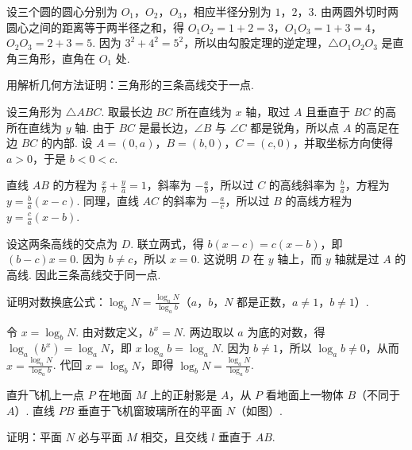 \documentclass[UTF8,a4paper,oneside,11pt]{ctexbook}
\begin{document}
\begin{solution}
设三个圆的圆心分别为 \(O_1\)，\(O_2\)，\(O_3\)，相应半径分别为 \(1\)，\(2\)，\(3\). 由两圆外切时两圆心之间的距离等于两半径之和，得 \(O_1O_2=1+2=3\)，\(O_1O_3=1+3=4\)，\(O_2O_3=2+3=5\). 因为 \(3^{2}+4^{2}=5^{2}\)，所以由勾股定理的逆定理，\(\triangle O_1O_2O_3\) 是直角三角形，直角在 \(O_1\) 处.
\end{solution}

\begin{problem}
用解析几何方法证明：三角形的三条高线交于一点.
\end{problem}

\begin{solution}
设三角形为 \(\triangle ABC\). 取最长边 \(BC\) 所在直线为 \(x\) 轴，取过 \(A\) 且垂直于 \(BC\) 的高所在直线为 \(y\) 轴. 由于 \(BC\) 是最长边，\(\angle B\) 与 \(\angle C\) 都是锐角，所以点 \(A\) 的高足在边 \(BC\) 的内部. 设 \(A=(0,a)\)，\(B=(b,0)\)，\(C=(c,0)\)，并取坐标方向使得 \(a>0\)，于是 \(b<0<c\).

直线 \(AB\) 的方程为 \(\frac{x}{b}+\frac{y}{a}=1\)，斜率为 \(-\frac{a}{b}\)，所以过 \(C\) 的高线斜率为 \(\frac{b}{a}\)，方程为 \(y=\frac{b}{a}(x-c)\). 同理，直线 \(AC\) 的斜率为 \(-\frac{a}{c}\)，所以过 \(B\) 的高线方程为 \(y=\frac{c}{a}(x-b)\).

设这两条高线的交点为 \(D\). 联立两式，得 \(b(x-c)=c(x-b)\)，即 \((b-c)x=0\). 因为 \(b\neq c\)，所以 \(x=0\). 这说明 \(D\) 在 \(y\) 轴上，而 \(y\) 轴就是过 \(A\) 的高线. 因此三条高线交于同一点.
\end{solution}

\begin{problem}
证明对数换底公式：\(\log_b N = \frac{\log_a N}{\log_a b}\)（\(a\)，\(b\)，\(N\) 都是正数，\(a \neq 1\)，\(b \neq 1\)）.
\end{problem}

\begin{solution}
令 \(x=\log_b N\). 由对数定义，\(b^x=N\). 两边取以 \(a\) 为底的对数，得 \(\log_a\left(b^x\right)=\log_a N\)，即 \(x\log_a b=\log_a N\). 因为 \(b\neq1\)，所以 \(\log_a b\neq0\)，从而 \(x=\frac{\log_a N}{\log_a b}\). 代回 \(x=\log_b N\)，即得 \(\log_b N=\frac{\log_a N}{\log_a b}\).
\end{solution}

\begin{problem}
直升飞机上一点 \(P\) 在地面 \(M\) 上的正射影是 \(A\)，从 \(P\) 看地面上一物体 \(B\)（不同于 \(A\)）. 直线 \(PB\) 垂直于飞机窗玻璃所在的平面 \(N\)（如图）.

证明：平面 \(N\) 必与平面 \(M\) 相交，且交线 \(l\) 垂直于 \(AB\).

\begin{center}
\end{center}
\end{problem}
\end{document}
